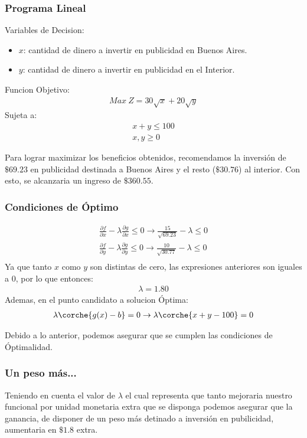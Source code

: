\begin{homeworkProblem}[-1][Quilmes]

\subsubsection{Programa Lineal}
Variables de Decision:
\begin{itemize}
    \item $x$: cantidad de dinero a invertir en publicidad en Buenos Aires.
    \item $y$: cantidad de dinero a invertir en publicidad en el Interior.
\end{itemize}
Funcion Objetivo:
\begin{align*}
    Max\ Z = 30\sqrt{x} + 20\sqrt{y}
\end{align*}
Sujeta a:
\begin{align*}
    x+y\leq 100 \\ x,y\geq0
\end{align*}

Para lograr maximizar los beneficios obtenidos, recomendamos la inversión de $\$69.23$ en publicidad destinada a Buenos Aires y el resto ($\$30.76$) al interior. Con esto, se alcanzaria un ingreso de $\$360.55$.

\subsubsection{Condiciones de Óptimo}

\begin{align*}
    \frac{\partial f}{\partial x} - \lambda \frac{\partial g}{\partial x} \leq 0 \rightarrow \frac{15}{\sqrt{69.23}} - \lambda \leq 0 \\
    \frac{\partial f}{\partial y} - \lambda \frac{\partial g}{\partial y} \leq 0 \rightarrow \frac{10}{\sqrt{30.77}} - \lambda \leq 0 \\
\end{align*}
Ya que tanto $x$ como $y$ son distintas de cero, las expresiones anteriores son iguales a $0$, por lo que entonces:
\begin{align*}
    \lambda = 1.80
\end{align*}
Ademas, en el punto candidato a solucion Óptima:
\begin{align*}
    \lambda\corche{g(x)-b} = 0 \rightarrow \lambda\corche{x+y-100} = 0
\end{align*}

Debido a lo anterior, podemos asegurar que se cumplen las condiciones de Óptimalidad.



\subsubsection{Un peso más...}
Teniendo en cuenta el valor de $\lambda$ el cual representa que tanto mejoraria nuestro funcional por unidad monetaria extra que se disponga
podemos asegurar que la ganancia, de disponer de un peso más detinado a inversión en pubilicidad, aumentaria en $\$1.8$ extra.
\end{homeworkProblem}